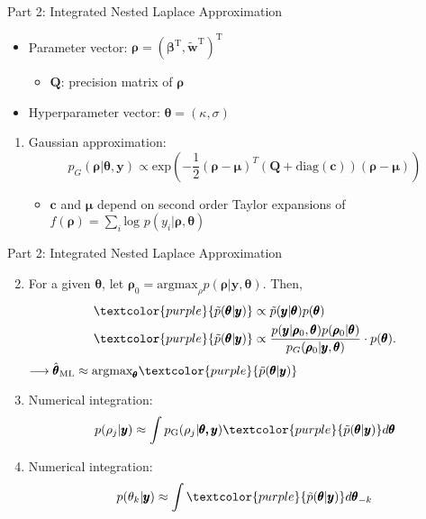 \documentclass{beamer}
\begin{document}
\begin{frame}{Part 2: Integrated Nested Laplace Approximation} {\citep{Rue2009}}
\begin{itemize}
\addtolength{\itemsep}{0.5\baselineskip}
\item Parameter vector: $\pmb{\rho} = ( \pmb{\beta}^{\text{T}}, \widetilde{\pmb{w}}^{\text{T}} )^{\text{T}}$
            \begin{itemize}
            \addtolength{\itemsep}{0.5\baselineskip}
            \item $\pmb{Q}$: precision matrix of $\pmb{\rho}$
            \end{itemize}
\item Hyperparameter vector: $\pmb{\theta} = (\kappa, \sigma )$
\end{itemize}

\begin{enumerate}

\item Gaussian approximation:
$$ p_{G}(\pmb{\rho}|\pmb{\theta}, \pmb{y}) \propto \text{exp} \left( -\frac{1}{2}(\pmb{\rho-\mu})^{T} (\pmb{Q} + \text{diag}(\pmb{c}) ) (\pmb{\rho - \mu}) \right) $$
              \begin{itemize}
              \item $\pmb{c}$ and $\pmb{\mu}$ depend on second order Taylor expansions of $f(\pmb{\rho}) = \sum_{i} \text{log }p(y_{i}|\pmb{\rho},\pmb{\theta})$
              \end{itemize}
\end{enumerate}
\end{frame}


\begin{frame}{Part 2: Integrated Nested Laplace Approximation} {\citep{Rue2009}}
\begin{enumerate}
\setcounter{enumi}{1}
\addtolength{\itemsep}{0.5\baselineskip}
\item For a given $\pmb{\theta}$, let $\pmb{\rho}_{0} = \text{argmax}_{\rho}p(\pmb{\rho}|\pmb{y},\pmb{\theta})$. Then,
\begin{align}
\textcolor{purple}{ \tilde{p}(\pmb{\theta}|\pmb{y})} & \propto \tilde{p}(\pmb{y}|\pmb{\theta}) p(\pmb{\theta}) \nonumber \\
\textcolor{purple}{\tilde{p}(\pmb{\theta}|\pmb{y})} & \propto  \frac{p(\pmb{y} | \pmb{\rho}_{0}, \pmb{\theta}) p(\pmb{\rho}_{0} | \pmb{\theta})}{p_{G}(\pmb{\rho}_{0} | \pmb{y}, \pmb{\theta})} \cdot p(\pmb{\theta}). \nonumber
\end{align}
$\longrightarrow \hat{\pmb{\theta}}_{\text{ML}} \approx \text{argmax}_{\pmb{\theta}} \textcolor{purple}{\tilde{p}(\pmb{\theta}|\pmb{y})}$
\item Numerical integration:
        $$ p(\rho_{j} | \pmb{y}) \approx \int p_{\text{G}}(\rho_{j}|\pmb{\theta, y}) \textcolor{purple}{\tilde{p}(\pmb{\theta}|\pmb{y})} d\pmb{\theta} $$
\item Numerical integration:
$$ p(\theta_{k} | \pmb{y}) \approx \int \textcolor{purple}{\tilde{p}(\pmb{\theta}|\pmb{y})} d\pmb{\theta}_{-k} $$
\end{enumerate}

\end{frame}
\end{document}
